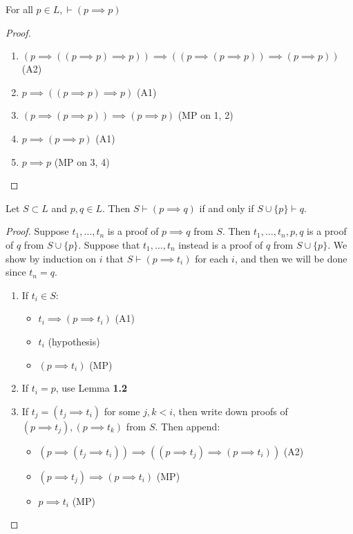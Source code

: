 \documentclass[10pt,a4paper]{article}
\begin{document}
\begin{lemma}
For all $p \in L, \vdash (p \implies p)$
\end{lemma}
\begin{proof}
\item
\begin{enumerate}
\item $(p \implies ((p \implies p) \implies p)) \implies ((p \implies (p\implies p))\implies (p \implies p))$ \hfill (A2)
\item $p \implies ((p \implies p)\implies p)$ \hfill (A1)
\item $(p \implies (p \implies p)) \implies (p \implies p)$ \hfill (MP on 1, 2)
\item $p \implies (p \implies p)$ \hfill (A1)
\item $p \implies p$ \hfill (MP on 3, 4)
\end{enumerate}
\end{proof}
\begin{proposition}
Let $S \subset L$ and $p, q \in L$. Then $S \vdash (p \implies q)$ if and only if $S \cup \{p\} \vdash q$.
\end{proposition}
\begin{proof}
Suppose $t_1, \ldots, t_n$ is a proof of $p \implies q$ from $S$. Then $t_1, \ldots, t_n, p, q$ is a proof of $q$ from $S \cup \{p\}$. Suppose that $t_1, \ldots, t_n$ instead is a proof of $q$ from $S \cup \{p\}$. We show by induction on $i$ that $S \vdash (p \implies t_i)$ for each $i$, and then we will be done since $t_n = q$.
\begin{enumerate}
\item If $t_i \in S$:
\begin{itemize}
\item $t_i \implies (p \implies t_i)$ \hfill (A1)
\item $t_i$ \hfill (hypothesis)
\item $(p \implies t_i)$ \hfill (MP)
\end{itemize}
\item If $t_i = p$, use Lemma \textbf{1.2}
\item If $t_j = (t_j \implies t_i)$ for some $j, k < i$, then write down proofs of $(p \implies t_j), (p \implies t_k)$ from $S$. Then append:
\begin{itemize}
\item $(p \implies (t_j \implies t_i)) \implies ((p \implies t_j) \implies (p \implies t_i))$ \hfill (A2)
\item $(p \implies t_j) \implies (p \implies t_i)$ \hfill (MP)
\item $p \implies t_i$ \hfill (MP)
\end{itemize}
\end{enumerate}
\end{proof}
\end{document}
